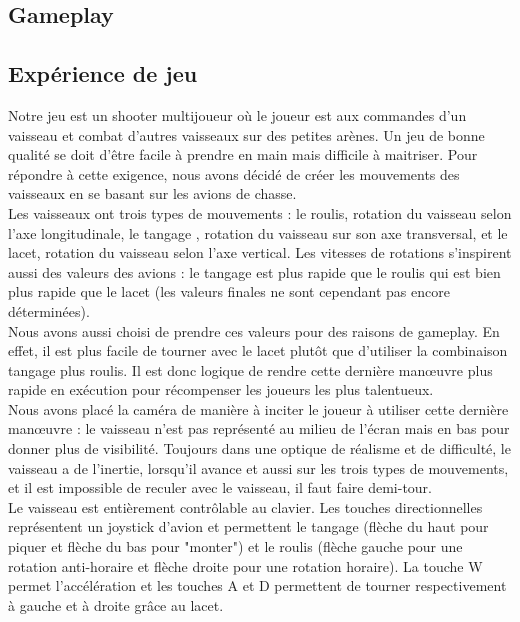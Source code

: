\documentclass[12pt, titlepage]{article}
\begin{document}
\begin{spacing}{1.5}
\newpage
\section{Gameplay}

\subsection{Expérience de jeu}

Notre jeu est un shooter multijoueur où le joueur est aux commandes d'un vaisseau et combat d'autres vaisseaux sur des petites arènes. Un jeu de bonne qualité se doit d'être facile à prendre en main mais difficile à maitriser. Pour répondre à cette exigence, nous avons décidé de créer les mouvements des vaisseaux en se basant sur les avions de chasse.\\

Les vaisseaux ont trois types de mouvements : le roulis, rotation du vaisseau selon l'axe longitudinale, le tangage , rotation du vaisseau sur son axe transversal, et le lacet, rotation du vaisseau selon l'axe vertical. Les vitesses de rotations s'inspirent aussi des valeurs des avions : le tangage est plus rapide que le roulis qui est bien plus rapide que le lacet (les valeurs finales ne sont cependant pas encore déterminées). \\

Nous avons aussi choisi de prendre ces valeurs pour des raisons de gameplay. En effet, il est plus facile de tourner avec le lacet plutôt que d'utiliser la combinaison tangage plus roulis. Il est donc logique de rendre cette dernière manœuvre plus rapide en exécution pour récompenser les joueurs les plus talentueux. \\

Nous avons placé la caméra de manière à inciter le joueur à utiliser cette dernière manœuvre : le vaisseau n'est pas représenté au milieu de l'écran mais en bas pour donner plus de visibilité. Toujours dans une optique de réalisme et de difficulté, le vaisseau a de l'inertie, lorsqu'il avance et aussi sur les trois types de mouvements, et il est impossible de reculer avec le vaisseau, il
faut faire demi-tour. \\

Le vaisseau est entièrement contrôlable au clavier. Les touches directionnelles représentent un joystick d'avion et permettent le tangage (flèche du haut pour piquer et flèche du bas pour "monter") et le roulis (flèche gauche pour une rotation anti-horaire et flèche droite pour une rotation horaire). La touche W permet l'accélération et les touches A et D permettent de tourner respectivement à gauche et à droite grâce au lacet.\\


\end{spacing}
\end{document}
